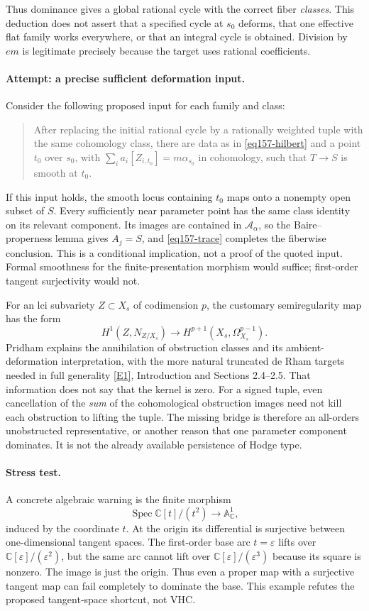 \documentclass[11pt,a4paper]{article}
\newcommand{\C}{\mathbb{C}}
\newcommand{\A}{\mathbb{A}}
\newcommand{\eref}[2]{\hyperlink{extra:#1:#2}{[E#2]}}
\numberwithin{equation}{section}
\begin{document}
Thus dominance gives a global rational cycle with the correct fiber
\emph{classes}. This deduction does not assert that a specified cycle at
$s_0$ deforms, that one effective flat family works everywhere, or that an
integral cycle is obtained. Division by $em$ is legitimate precisely
because the target uses rational coefficients.

\paragraph{Attempt: a precise sufficient deformation input.}
Consider the following proposed input for each family and class:
\begin{quote}
After replacing the initial rational cycle by a rationally weighted tuple
with the same cohomology class, there are data as in
\eqref{eq157-hilbert} and a point $t_0$ over $s_0$, with
$\sum_i a_i[Z_{i,t_0}]=m\alpha_{s_0}$ in cohomology, such that
$T\to S$ is smooth at $t_0$.
\end{quote}
If this input holds, the smooth locus containing $t_0$ maps onto a
nonempty open subset of $S$. Every sufficiently near parameter point has
the same class identity on its relevant component. Its images are
contained in $\mathcal A_\alpha$, so the Baire--properness lemma gives
$A_j=S$, and \eqref{eq157-trace} completes the fiberwise conclusion. This
is a conditional implication, not a proof of the quoted input.
Formal smoothness for the finite-presentation morphism would suffice;
first-order tangent surjectivity would not.

For an lci subvariety $Z\subset X_s$ of codimension $p$, the customary
semiregularity map has the form
\[
 H^1(Z,N_{Z/X_s})\longrightarrow
 H^{p+1}(X_s,\Omega_{X_s}^{p-1}).
\]
Pridham explains the annihilation of obstruction classes and its
ambient-deformation interpretation, with the more natural truncated
de Rham targets needed in full generality \eref{statement}{1}, Introduction
and Sections 2.4--2.5. That information does not say that the kernel is
zero. For a signed tuple, even cancellation of the \emph{sum} of the
cohomological obstruction images need not kill each obstruction to
lifting the tuple. The missing bridge is therefore an all-orders
unobstructed representative, or another reason that one parameter
component dominates. It is not the already available persistence of
Hodge type.

\paragraph{Stress test.}
A concrete algebraic warning is the finite morphism
\[
 \operatorname{Spec}\C[t]/(t^2)\longrightarrow\A^1_{\C},
\]
induced by the coordinate $t$. At the origin its differential is
surjective between one-dimensional tangent spaces. The first-order base
arc $t=\varepsilon$ lifts over $\C[\varepsilon]/(\varepsilon^2)$, but the
same arc cannot lift over $\C[\varepsilon]/(\varepsilon^3)$ because its
square is nonzero. The image is just the origin. Thus even a proper map
with a surjective tangent map can fail completely to dominate the base.
This example refutes the proposed tangent-space shortcut, not VHC.
\end{document}
